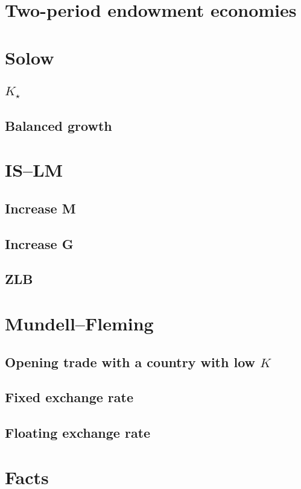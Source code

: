\documentclass[11pt]{article}
\begin{document}
\section{Two-period endowment economies}
\label{sec-3}
\section{Solow}
\label{sec-4}
\subsection{$K_{\star}$}
\label{sec-4-1}
\subsection{Balanced growth}
\label{sec-4-2}
\section{IS--LM}
\label{sec-5}
\subsection{Increase M}
\label{sec-5-1}
\subsection{Increase G}
\label{sec-5-2}
\subsection{ZLB}
\label{sec-5-3}
\section{Mundell--Fleming}
\label{sec-6}
\subsection{Opening trade with a country with low $K$}
\label{sec-6-1}
\subsection{Fixed exchange rate}
\label{sec-6-2}
\subsection{Floating exchange rate}
\label{sec-6-3}
\section{Facts}
\label{sec-7}
\end{document}
